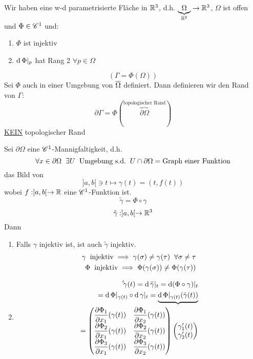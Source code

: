 Wir haben eine w-d parametrisierte Fläche in $\mathbb{R}^3$, d.h. $\underbrace{\Omega}_{\mathbb{R}^{2}}\rightarrow\mathbb{R}^3$, $\Omega$ ist offen und $\Phi\in\mathscr{C}^1$ und:
\begin{enumerate}
  \item $\Phi$ ist injektiv
  \item $\operatorname{d}\Phi|_p$ hat Rang 2 $\forall p\in \Omega$
\end{enumerate}
\[(\Gamma=\Phi(\Omega))\]
Sei $\Phi$ auch in einer Umgebung von $\overline{\Omega}$ definiert. Dann definieren wir den Rand von $\Gamma$: 
\[\partial\Gamma=\Phi(\overbrace{\partial\Omega}^{\text{topologischer Rand}})\]
\ul{KEIN} topologischer Rand
\begin{Bem}
  Sei $\partial\Omega$ eine $\mathscr{C}^1$-Mannigfaltigkeit, d.h.
  \[\forall x\in\partial\Omega\hspace{2mm}\exists U\hspace{2mm}\text{Umgebung s.d.}\hspace{2mm} U\cap\partial\Omega=\text{Graph einer Funktion}\]
  das Bild von 
  \[]a,b[\ni t\mapsto \gamma(t)=(t,f(t))\]
  wobei $f:]a,b[\rightarrow\mathbb{R}$ eine $\mathscr{C}^1$-Funktion ist.
  \[\tilde\gamma=\Phi\circ\gamma\]
  \[\tilde\gamma:]a,b[\rightarrow\mathbb{R}^3\]
  Dann
  \begin{enumerate}
    \item Falls $\gamma$ injektiv ist, ist auch $\tilde\gamma$ injektiv.
      \begin{eqnarray*}
        \gamma\hspace{2mm}\text{injektiv}\implies\gamma(\sigma)\neq\gamma(\tau)\hspace{2mm}\forall \sigma\neq\tau\\
        \Phi\hspace{2mm}\text{injektiv}\implies\Phi(\gamma(\sigma))\neq\Phi(\gamma(\tau))
      \end{eqnarray*}
    \item
      \begin{eqnarray*}
        \dot\tilde\gamma(t)=\md\tilde\gamma|_t=\md(\Phi\circ\gamma)|_t\\
        = \md\Phi|_{\gamma(t)}\circ\md\gamma|_t=\underbrace{\md\Phi|_{\gamma(t)}(\dot\gamma(t))}\\
        = \begin{pmatrix}
          \Part{\Phi_1}{x_1}(\gamma(t)) & \Part{\Phi_1}{x_2}(\gamma(t))\\
          \Part{\Phi_2}{x_1}(\gamma(t)) & \Part{\Phi_2}{x_2}(\gamma(t))\\
          \Part{\Phi_3}{x_1}(\gamma(t)) & \Part{\Phi_3}{x_2}(\gamma(t))
        \end{pmatrix} \begin{pmatrix}
          \gamma_1'(t)\\
          \gamma_2'(t)
        \end{pmatrix}\\

\end{eqnarray*}
\end{enumerate}
\end{Bem}
